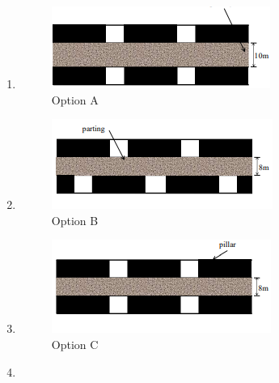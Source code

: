 \documentclass[journal,12pt,onecolumn]{IEEEtran}
\theoremstyle{remark}
\begin{document}
\begin{enumerate}
\hfill{}

\begin{multicols}{4}
\begin{enumerate}
\item \begin{figure}[H]
  \centering
  \includegraphics[width=1\columnwidth]{figs/opta.png}
  \caption{Option A}
  \label{fig:opta}
\end{figure}
\item \begin{figure}[H]
  \centering
  \includegraphics[width=1\columnwidth]{figs/optb.png}
  \caption{Option B}
  \label{fig:optb}
\end{figure}
\item \begin{figure}[H]
  \centering
  \includegraphics[width=1\columnwidth]{figs/optc.png}
  \caption{Option C}
  \label{fig:optc}
\end{figure}
\item \begin{figure}[H]

\end{figure}
\end{enumerate}
\end{multicols}
\end{enumerate}
\end{document}
